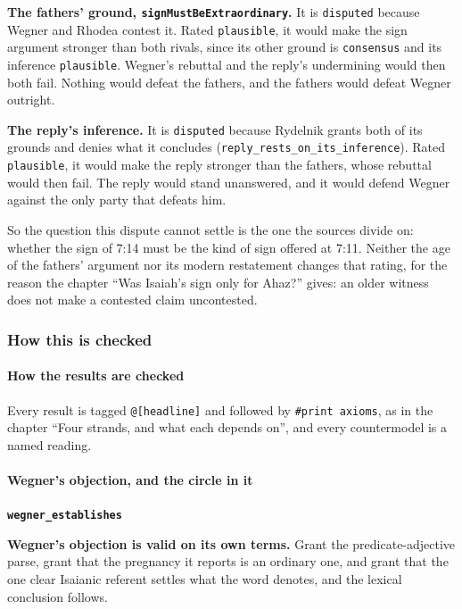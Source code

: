\documentclass[11pt]{article}
\begin{document}
\textbf{The fathers’ ground, \texttt{sign\allowbreak{}Must\allowbreak{}Be\allowbreak{}Extraordinary}.} It is \texttt{disputed} because Wegner and Rhodea contest it. Rated \texttt{plausible}, it would make the sign argument stronger than both rivals, since its other ground is \texttt{consensus} and its inference \texttt{plausible}. Wegner’s rebuttal and the reply’s undermining would then both fail. Nothing would defeat the fathers, and the fathers would defeat Wegner outright.

\textbf{The reply’s inference.} It is \texttt{disputed} because Rydelnik grants both of its grounds and denies what it concludes (\texttt{reply\_\allowbreak{}rests\_\allowbreak{}on\_\allowbreak{}its\_\allowbreak{}inference}). Rated \texttt{plausible}, it would make the reply stronger than the fathers, whose rebuttal would then fail. The reply would stand unanswered, and it would defend Wegner against the only party that defeats him.

So the question this dispute cannot settle is the one the sources divide on: whether the sign of 7:14 must be the kind of sign offered at 7:11. Neither the age of the fathers’ argument nor its modern restatement changes that rating, for the reason the chapter “Was Isaiah’s sign only for Ahaz?” gives: an older witness does not make a contested claim uncontested.

\subsubsection*{How this is checked}
\paragraph*{How the results are checked}
\leavevmode\par\nobreak
Every result is tagged \texttt{@[headline]} and followed by \texttt{\#print axioms}, as in the chapter “Four strands, and what each depends on”, and every countermodel is a named reading.

\paragraph*{Wegner’s objection, and the circle in it}
\leavevmode\par\nobreak
\par\medskip\noindent\textbf{\texttt{wegner\_\allowbreak{}establishes}}\par\nobreak\noindent
\textbf{Wegner’s objection is valid on its own terms.} Grant the predicate-adjective parse, grant that the pregnancy it reports is an ordinary one, and grant that the one clear Isaianic referent settles what the word denotes, and the lexical conclusion follows.
\end{document}
